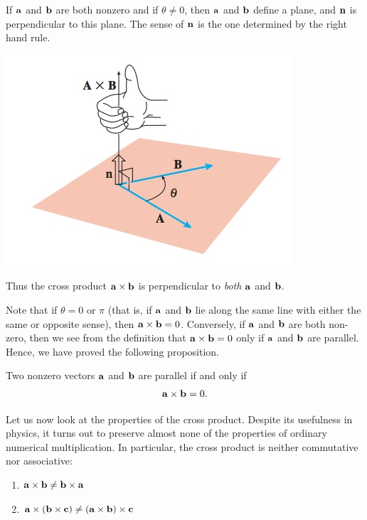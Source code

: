 \documentclass[12pt,letterpaper,reqno]{article}
\numberwithin{equation}{section}
\newcommand{\ti}[1]{\textit{#1}}
\begin{document}
If ${\bf a}$ and ${\bf b}$ are both nonzero and if $\theta \neq 0$, then ${\bf a}$ and ${\bf b}$ define a plane, and ${\bf n}$ is perpendicular to this plane. The sense of ${\bf n}$ is the one determined by the right hand rule. 
\begin{center}
	\includegraphics[scale=0.5]{figures_mvc/cross_product}
\end{center}
Thus the cross product ${\bf a} \times {\bf b}$ is perpendicular to \ti{both} ${\bf a}$ and ${\bf b}$.

Note that if $\theta=0$ or $\pi$ (that is, if ${\bf a}$ and ${\bf b}$ lie along the same line with either the same or opposite sense), then ${\bf a} \times {\bf b}=0$. Conversely, if ${\bf a}$ and ${\bf b}$ are both non-zero, then we see from the definition that ${\bf a} \times {\bf b}=0$ only if ${\bf a}$ and ${\bf b}$ are parallel. Hence, we have proved the following proposition.

\begin{prop}
	Two nonzero vectors ${\bf a}$ and ${\bf b}$ are parallel if and only if 
	\begin{align*}
		{\bf a} \times {\bf b}=0.
	\end{align*}
\end{prop}

Let us now look at the properties of the cross product. Despite its usefulness in physics, it turns out to preserve almost none of the properties of ordinary numerical multiplication. In particular, the cross product is neither commutative nor associative:


\begin{enumerate}[(1)]
	\item ${\bf a} \times {\bf b} \neq {\bf b}  \times {\bf a}$
	\item ${\bf a} \times ({\bf b} \times {\bf c}) \neq ({\bf a} \times {\bf b}) \times {\bf c}$
\end{enumerate}	
\end{document}
